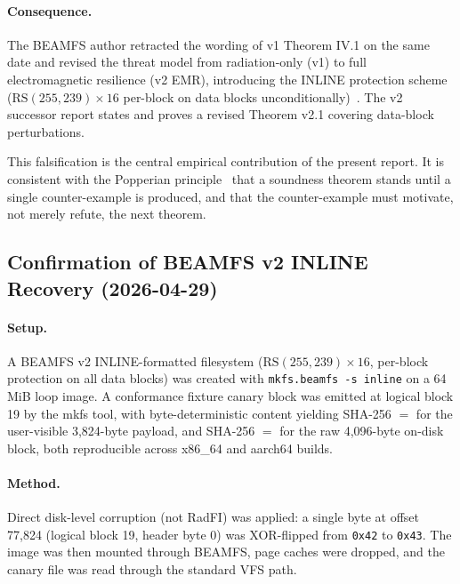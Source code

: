 \paragraph{Consequence.}
The BEAMFS author retracted the wording of v1 Theorem IV.1 on the
same date and revised the threat model from radiation-only (v1) to
full electromagnetic resilience (v2 EMR), introducing the INLINE
protection scheme (\(\mathrm{RS}(255,239) \times 16\) per-block on
data blocks unconditionally)~\cite{desbrieres2026beamfsv2}. The v2
successor report states and proves a revised Theorem v2.1 covering
data-block perturbations.

This falsification is the central empirical contribution of the
present report. It is consistent with the Popperian
principle~\cite{popper1959logic} that a soundness theorem stands
until a single counter-example is produced, and that the
counter-example must motivate, not merely refute, the next theorem.

\subsection{Confirmation of BEAMFS v2 INLINE Recovery (2026-04-29)}\label{ssec:confirmation}

\paragraph{Setup.}
A BEAMFS v2 INLINE-formatted filesystem (\(\mathrm{RS}(255,239)
\times 16\), per-block protection on all data blocks) was created
with \texttt{mkfs.beamfs -s inline} on a 64\,MiB loop image. A
conformance fixture canary block was emitted at logical block 19 by
the mkfs tool, with byte-deterministic content yielding SHA-256
\(=\)
\texttt{}
for the user-visible 3{,}824-byte payload, and SHA-256 \(=\)
\texttt{}
for the raw 4{,}096-byte on-disk block, both reproducible across
x86\_64 and aarch64 builds.

\paragraph{Method.}
Direct disk-level corruption (not RadFI) was applied: a single byte
at offset 77{,}824 (logical block 19, header byte 0) was XOR-flipped
from \texttt{0x42} to \texttt{0x43}. The image was then mounted
through BEAMFS, page caches were dropped, and the canary file was
read through the standard VFS path.

